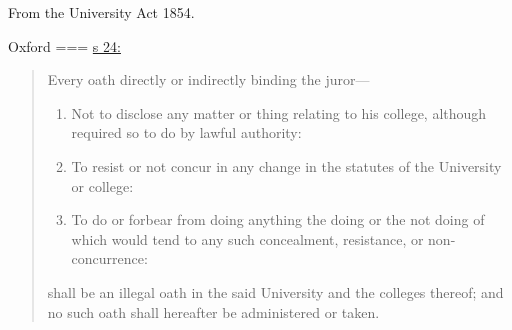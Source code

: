 From the University Act 1854.

Oxford
===
\href{https://www.legislation.gov.uk/ukpga/Vict/17-18/81/section/24}{s 24:}
\begin{quote}
Every oath directly or indirectly binding the juror—
\begin{enumerate}[label={}]
    \item Not to disclose any matter or thing relating to his college, although required so to do by lawful authority:
    \item To resist or not concur in any change in the statutes of the University or college:
    \item To do or forbear from doing anything the doing or the not doing of which would tend to any such concealment, resistance, or non-concurrence: 
\end{enumerate}
shall be an illegal oath in the said University and the colleges thereof; and no such oath shall hereafter be administered or taken. 
\end{quote}